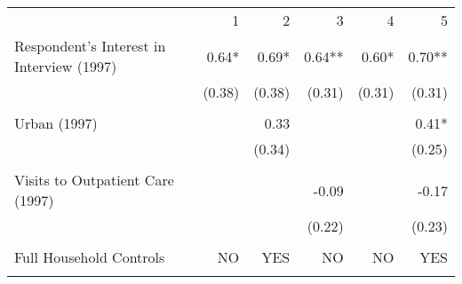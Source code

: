 \begin{table}[!h]
\centering
\begin{tabular}{llllll}
\cline{1-6}
\multicolumn{1}{c}{} &
  \multicolumn{1}{r}{1} &
  \multicolumn{1}{r}{2} &
  \multicolumn{1}{r}{3} &
  \multicolumn{1}{r}{4} &
  \multicolumn{1}{r}{5} \\
\cline{1-6}
\multicolumn{1}{l}{Respondent's Interest in Interview (1997)} &
  \multicolumn{1}{r}{0.64* } &
  \multicolumn{1}{r}{0.69* } &
  \multicolumn{1}{r}{0.64** } &
  \multicolumn{1}{r}{0.60* } &
  \multicolumn{1}{r}{0.70** } \\
\multicolumn{1}{l}{} &
  \multicolumn{1}{r}{(0.38)} &
  \multicolumn{1}{r}{(0.38)} &
  \multicolumn{1}{r}{(0.31)} &
  \multicolumn{1}{r}{(0.31)} &
  \multicolumn{1}{r}{(0.31)} \\
\multicolumn{1}{l}{} &
  \multicolumn{1}{r}{} &
  \multicolumn{1}{r}{} &
  \multicolumn{1}{r}{} &
  \multicolumn{1}{r}{} &
  \multicolumn{1}{r}{} \\
\multicolumn{1}{l}{Urban (1997)} &
  \multicolumn{1}{r}{} &
  \multicolumn{1}{r}{0.33 } &
  \multicolumn{1}{r}{} &
  \multicolumn{1}{r}{} &
  \multicolumn{1}{r}{0.41* } \\
\multicolumn{1}{l}{} &
  \multicolumn{1}{r}{} &
  \multicolumn{1}{r}{(0.34)} &
  \multicolumn{1}{r}{} &
  \multicolumn{1}{r}{} &
  \multicolumn{1}{r}{(0.25)} \\
\multicolumn{1}{l}{} &
  \multicolumn{1}{r}{} &
  \multicolumn{1}{r}{} &
  \multicolumn{1}{r}{} &
  \multicolumn{1}{r}{} &
  \multicolumn{1}{r}{} \\
\multicolumn{1}{l}{Visits to Outpatient Care (1997)} &
  \multicolumn{1}{r}{} &
  \multicolumn{1}{r}{} &
  \multicolumn{1}{r}{-0.09 } &
  \multicolumn{1}{r}{} &
  \multicolumn{1}{r}{-0.17 } \\
\multicolumn{1}{l}{} &
  \multicolumn{1}{r}{} &
  \multicolumn{1}{r}{} &
  \multicolumn{1}{r}{(0.22)} &
  \multicolumn{1}{r}{} &
  \multicolumn{1}{r}{(0.23)} \\
\multicolumn{1}{l}{} &
  \multicolumn{1}{r}{} &
  \multicolumn{1}{r}{} &
  \multicolumn{1}{r}{} &
  \multicolumn{1}{r}{} &
  \multicolumn{1}{r}{} \\
\multicolumn{1}{l}{Full Household Controls} &
  \multicolumn{1}{r}{NO} &
  \multicolumn{1}{r}{YES} &
  \multicolumn{1}{r}{NO} &
  \multicolumn{1}{r}{NO} &
  \multicolumn{1}{r}{YES} \\
\multicolumn{1}{l}{} &
  \multicolumn{1}{r}{} &
  \multicolumn{1}{r}{} &
  \multicolumn{1}{r}{} &
  \multicolumn{1}{r}{} &
  \multicolumn{1}{r}{} \\

\end{tabular}
\end{table}

